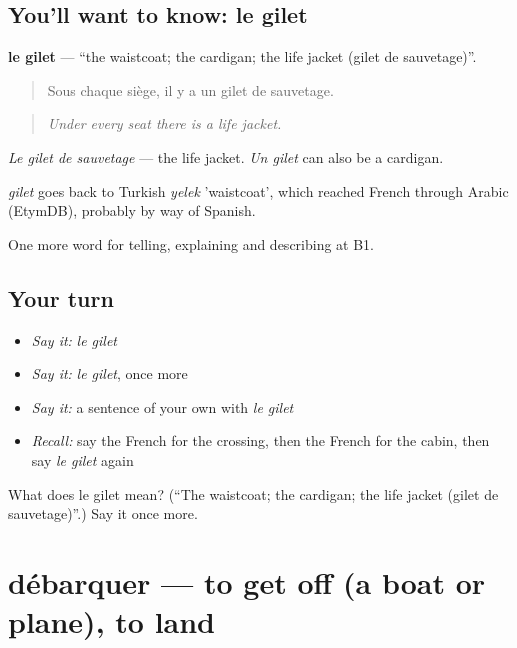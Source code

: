 \subsection*{You'll want to know: le gilet}
\textbf{le gilet} — \textquotedblleft{}the waistcoat; the cardigan; the life jacket (gilet de sauvetage)\textquotedblright{}.

\begin{quote}
Sous chaque siège, il y a un gilet de sauvetage.
\end{quote}

\begin{quote}
\emph{Under every seat there is a life jacket.}
\end{quote}

\emph{Le gilet de sauvetage} — the life jacket. \emph{Un gilet} can also be a cardigan.

\begin{cousinweb}
\emph{gilet} goes back to Turkish \emph{yelek} 'waistcoat', which reached French through Arabic (EtymDB), probably by way of Spanish.
\end{cousinweb}

\begin{grammarlens}[title={What you've built}]
One more word for telling, explaining and describing at B1.
\end{grammarlens}

\subsection*{Your turn}
\begin{itemize}
\raggedright
  \item \emph{Say it:} \emph{le gilet}
  \item \emph{Say it:} \emph{le gilet}, once more
  \item \emph{Say it:} a sentence of your own with \emph{le gilet}
  \item \emph{Recall:} say the French for the crossing, then the French for the cabin, then say \emph{le gilet} again
\end{itemize}

\begin{tcolorbox}[breakable,colback=teal!4,colframe=teal!35!black,title={Before you move on}]
What does le gilet mean? (\textquotedblleft{}The waistcoat; the cardigan; the life jacket (gilet de sauvetage)\textquotedblright{}.) Say it once more.
\end{tcolorbox}
\section[débarquer]{débarquer — to get off (a boat or plane), to land}

